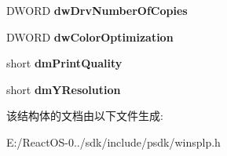 \begin{DoxyCompactItemize}
D\+W\+O\+RD {\bfseries dw\+Drv\+Number\+Of\+Copies}
\item 
\mbox{\label{struct___a_t_t_r_i_b_u_t_e___i_n_f_o__3_a3a3d122472be45fc0ce99d0531067d0e}} 
D\+W\+O\+RD {\bfseries dw\+Color\+Optimization}
\item 
\mbox{\label{struct___a_t_t_r_i_b_u_t_e___i_n_f_o__3_af96b030f702d0335d872b3e71034adc4}} 
short {\bfseries dm\+Print\+Quality}
\item 
\mbox{\label{struct___a_t_t_r_i_b_u_t_e___i_n_f_o__3_a2503318a4a913153cc8ca0e03a834cd8}} 
short {\bfseries dm\+Y\+Resolution}
\end{DoxyCompactItemize}


该结构体的文档由以下文件生成\+:\begin{DoxyCompactItemize}
\item 
E\+:/\+React\+O\+S-\/0../sdk/include/psdk/winsplp.\+h\end{DoxyCompactItemize}
